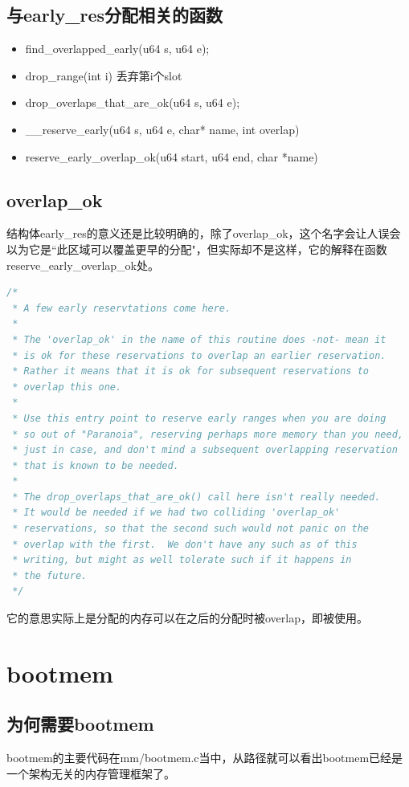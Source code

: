 \documentclass[b5paper,9pt,twoside,openany]{article}
\begin{document}
\subsection{与early\_res分配相关的函数}
\begin{itemize}
\item find\_overlapped\_early(u64 s, u64 e);
\item drop\_range(int i) 丢弃第i个slot
\item drop\_overlaps\_that\_are\_ok(u64 s, u64 e);
\item \_\_reserve\_early(u64 s, u64 e, char* name, int overlap)
\item reserve\_early\_overlap\_ok(u64 start, u64 end, char *name)
\end{itemize}

\subsection{overlap\_ok}

结构体early\_res的意义还是比较明确的，除了overlap\_ok，这个名字会让人误会以为它是“此区域可以覆盖更早的分配"，但实际却不是这样，它的解释在函数reserve\_early\_overlap\_ok处。
\begin{lstlisting}[language=C]
/*
 * A few early reservtations come here.
 *
 * The 'overlap_ok' in the name of this routine does -not- mean it
 * is ok for these reservations to overlap an earlier reservation.
 * Rather it means that it is ok for subsequent reservations to
 * overlap this one.
 *
 * Use this entry point to reserve early ranges when you are doing
 * so out of "Paranoia", reserving perhaps more memory than you need,
 * just in case, and don't mind a subsequent overlapping reservation
 * that is known to be needed.
 *
 * The drop_overlaps_that_are_ok() call here isn't really needed.
 * It would be needed if we had two colliding 'overlap_ok'
 * reservations, so that the second such would not panic on the
 * overlap with the first.  We don't have any such as of this
 * writing, but might as well tolerate such if it happens in
 * the future.
 */
\end{lstlisting}

它的意思实际上是分配的内存可以在之后的分配时被overlap，即被使用。

\section{bootmem}
\subsection{为何需要bootmem}
bootmem的主要代码在mm/bootmem.c当中，从路径就可以看出bootmem已经是一个架构无关的内存管理框架了。
\end{document}
